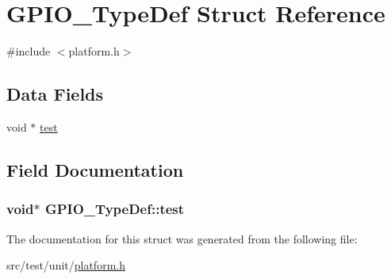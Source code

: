 \hypertarget{structGPIO__TypeDef}{\section{G\+P\+I\+O\+\_\+\+Type\+Def Struct Reference}
\label{structGPIO__TypeDef}
}


{\ttfamily \#include $<$platform.\+h$>$}

\subsection*{Data Fields}
\begin{DoxyCompactItemize}
\item 
void $\ast$ \hyperlink{structGPIO__TypeDef_ab9862e7fa9a19819f9f77ab8b7595ea7}{test}
\end{DoxyCompactItemize}


\subsection{Field Documentation}
\hypertarget{structGPIO__TypeDef_ab9862e7fa9a19819f9f77ab8b7595ea7}{
\subsubsection[{test}]{\setlength{\rightskip}{0pt plus 5cm}void$\ast$ G\+P\+I\+O\+\_\+\+Type\+Def\+::test}}\label{structGPIO__TypeDef_ab9862e7fa9a19819f9f77ab8b7595ea7}


The documentation for this struct was generated from the following file\+:\begin{DoxyCompactItemize}
\item 
src/test/unit/\hyperlink{test_2unit_2platform_8h}{platform.\+h}\end{DoxyCompactItemize}
